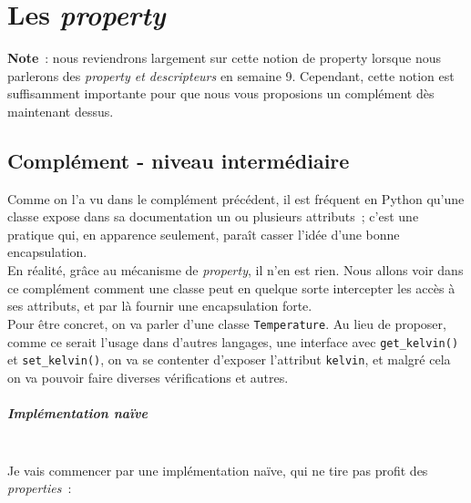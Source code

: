     \hypertarget{les-property}{%
\section{\texorpdfstring{Les
\emph{property}}{Les property}}\label{les-property}}

    \textbf{Note}~: nous reviendrons largement sur cette notion de property
lorsque nous parlerons des \emph{property et descripteurs} en semaine 9.
Cependant, cette notion est suffisamment importante pour que nous vous
proposions un complément dès maintenant dessus.

    \hypertarget{compluxe9ment---niveau-intermuxe9diaire}{%
\subsection{Complément - niveau
intermédiaire}\label{compluxe9ment---niveau-intermuxe9diaire}}

    Comme on l'a vu dans le complément précédent, il est fréquent en Python
qu'une classe expose dans sa documentation un ou plusieurs attributs~;
c'est une pratique qui, en apparence seulement, paraît casser l'idée
d'une bonne encapsulation.\\

En réalité, grâce au mécanisme de \emph{property}, il n'en est rien.
Nous allons voir dans ce complément comment une classe peut en quelque
sorte intercepter les accès à ses attributs, et par là fournir une
encapsulation forte.\\

    Pour être concret, on va parler d'une classe \texttt{Temperature}. Au
lieu de proposer, comme ce serait l'usage dans d'autres langages, une
interface avec \texttt{get\_kelvin()} et \texttt{set\_kelvin()}, on va
se contenter d'exposer l'attribut \texttt{kelvin}, et malgré cela on va
pouvoir faire diverses vérifications et autres.

    \hypertarget{impluxe9mentation-nauxefve}{%
\subparagraph{Implémentation naïve\\\\}\label{impluxe9mentation-nauxefve}}

    Je vais commencer par une implémentation naïve, qui ne tire pas profit
des \emph{properties}~:


